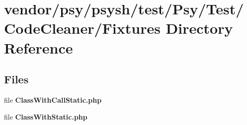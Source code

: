 \section{vendor/psy/psysh/test/\+Psy/\+Test/\+Code\+Cleaner/\+Fixtures Directory Reference}
\label{dir_34131135f16040506b1fe77746cb2173}
\subsection*{Files}
\begin{DoxyCompactItemize}
\item 
file {\bf Class\+With\+Call\+Static.\+php}
\item 
file {\bf Class\+With\+Static.\+php}
\end{DoxyCompactItemize}
